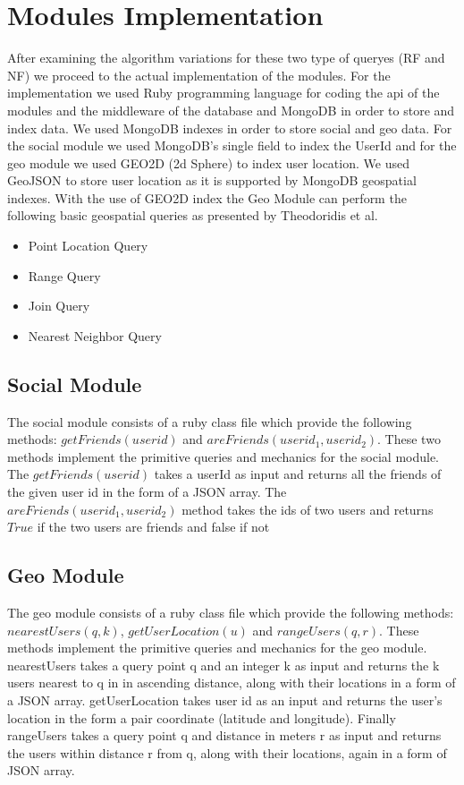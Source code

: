 \documentclass[prodmode,acmtods]{acmsmall} %
\begin{document}
\section{Modules Implementation}
After examining the algorithm variations for these two type of queryes (RF and NF) we proceed to the actual implementation of the modules.
For the implementation we used Ruby\cite{ruby} programming language for coding the api of the modules and the middleware of the database and MongoDB\cite{mongod} in order to store and index data.
We used MongoDB indexes in order to store social and geo data. For the social module we used MongoDB's single field to index the UserId and for the geo module we used GEO2D (2d Sphere) to index user location. We used GeoJSON\cite{geoJSON} to store user location as it is supported by MongoDB geospatial indexes. With the use of GEO2D index the Geo Module can perform the following basic geospatial queries as presented by Theodoridis et al. \cite{Corral:ClosestPair}

\begin{itemize}
  \item Point Location Query
  \item Range Query
  \item Join Query
  \item Nearest Neighbor Query
\end{itemize}


\subsection{Social Module}
The social module consists of a ruby class file which provide the following methods:
$getFriends(userid)$ and $areFriends(userid_1, userid_2)$. These two methods implement the primitive queries and mechanics for the social module. 
The $getFriends(userid)$ takes a userId as input and returns all the friends of the given user id in the form of a JSON \cite{json} array.
The $areFriends(userid_1, userid_2)$ method takes the ids of two users and returns
$True$ if the two users are friends and false if not

\subsection{Geo Module}
The geo module consists of a ruby class file which provide the following methods:
$nearestUsers(q, k)$, $getUserLocation(u)$ and $rangeUsers(q, r)$. These methods implement the primitive queries and mechanics for the geo module.
nearestUsers  takes a query point q and an integer k as input and returns the k users nearest to q in in ascending distance, along with their locations in a form of a JSON\cite{json} array.
getUserLocation takes user id as an input and returns the user's location in the form a pair coordinate (latitude and longitude).
Finally rangeUsers takes a query point q and distance in meters r as input and returns the users within distance r from q, along with their locations, again in a form of JSON\cite{json} array.
\end{document}
